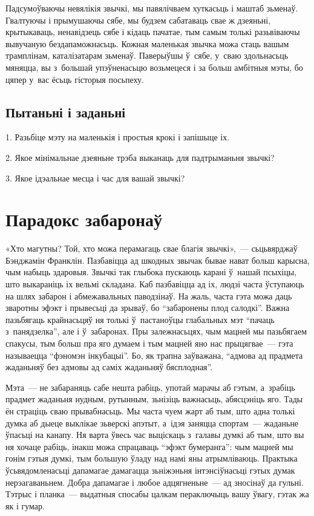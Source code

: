 Падсумоўваючы невялікія звычкі, мы павялічваем хуткасьць і маштаб зьменаў. Гвалтуючы і прымушаючы сябе, мы будзем сабатаваць свае ж дзеяньні, крытыкаваць, ненавідзець сябе і кідаць пачатае, тым самым толькі разьвіваючы вывучаную бездапаможнасьць. Кожная маленькая звычка можа стаць вашым трамплінам, каталізатарам зьменаў. Паверыўшы ў~сябе, у~сваю здольнасьць мяняцца, вы з~большай упэўненасьцю возьмецеся і за больш амбітныя мэты, бо цяпер у~вас ёсьць гісторыя посьпеху.

\subsection*{Пытаньні і заданьні}

1. Разьбіце мэту на маленькія і простыя крокі і запішыце іх.

2. Якое мінімальнае дзеяньне трэба выканаць для падтрыманьня звычкі?

3. Якое ідэальнае месца і час для вашай звычкі?


\section{Парадокс забаронаў}

«Хто магутны? Той, хто можа перамагаць свае благія звычкі»,~--- сьцьвярджаў Бэнджамін Франклін. Пазбавіцца ад шкодных звычак бывае нават больш карысна, чым набыць здаровыя. Звычкі так глыбока пускаюць карані ў~нашай псыхіцы, што выкараніць іх вельмі складана. Каб пазбавіцца ад іх, людзі часта ўступаюць на шлях забарон і абмежавальных паводзінаў. На жаль, часта гэта можа даць зваротны эфэкт і прывесьці да зрываў, бо ``забаронены плод салодкі''. Важна пазьбягаць крайнасьцяў ня толькі ў~пастаноўцы глабальных мэт ``пачаць з~панядзелка'', але і ў~забаронах. Пры залежнасьцях, чым мацней мы пазьбягаем спакусы, тым больш пра яго думаем і тым мацней яно нас прыцягвае~--- гэта называецца ``фэномэн інкубацыі''. Бо, як трапна заўважана, ``адмова ад прадмета жаданьняў без адмовы ад саміх жаданьняў бясплодная''. 

Мэта~--- не забараняць сабе нешта рабіць, употай марачы аб гэтым, а~зрабіць прадмет жаданьня нудным, рутынным, зьнізіць важнасьць, абясцэніць яго. Тады ён страціць сваю прывабнасьць. Мы часта чуем жарт аб тым, што адна толькі думка аб дыеце выклікае зьверскі апэтыт, а~ідэя заняцца спортам~--- жаданьне ўпасьці на канапу. Ня варта ўвесь час выціскаць з~галавы думкі аб тым, што вы ня хочаце рабіць, інакш можа спрацаваць ``эфэкт бумеранга'': чым мацней мы гонім гэтыя думкі, тым большую ўладу над намі яны атрымліваюць. Практыка ўсьвядомленасьці дапамагае дамагацца зьніжэньня інтэнсіўнасьці гэтых думак нерэагаваньнем. Добра дапамагае і любое адцягненьне~--- ад зносінаў да гульні. Тэтрыс і планка~--- выдатныя спосабы цалкам пераключыць вашу ўвагу, гэтак жа як і гумар.

